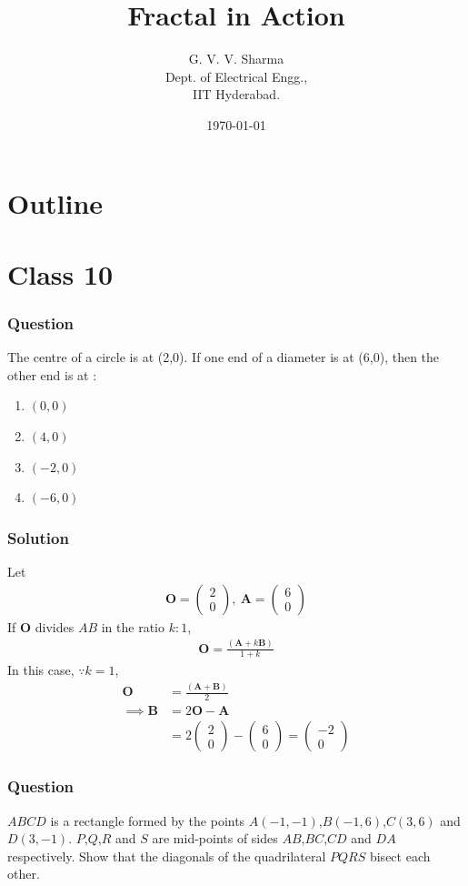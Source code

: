 \documentclass{beamer}
\title{Fractal in Action}
\author{G. V. V. Sharma \\ Dept. of Electrical Engg.,\\IIT Hyderabad.}
\date{\today}
\providecommand{\brak}[1]{\ensuremath{\left(#1\right)}}
\theoremstyle{remark}
\newcommand{\myvec}[1]{\ensuremath{\begin{pmatrix}#1\end{pmatrix}}}
\let\vec\mathbf
\begin{document}
\begin{frame}
\titlepage
\end{frame}

\section*{Outline}
\begin{frame}
\tableofcontents
\end{frame}
\section{Class 10}
\begin{frame}
\frametitle{Question}
The centre of a circle is at (2,0). If one end of a diameter is at (6,0), then the other end is at :
\begin{enumerate}
\item $\brak{0,0}$
\item $\brak{4,0}$
\item $\brak{-2,0}$
\item $\brak{-6,0}$
\end{enumerate}
\end{frame}
%
\begin{frame}
\frametitle{Solution}
Let
\begin{align}
	\vec{O} =
    \myvec{
2 \\
0 
},\
\vec{A} =
    \myvec{
6 \\
0 
}
\end{align}
If $\vec{O}$
divides $AB$ in the ratio $k:1$,
\begin{align}
	\label{eq:section}
\vec{O} = \frac{\brak{\vec{A} +k \vec{B}}}{1+k}
\end{align}
In this case,  $\because k = 1$,
\begin{align}
\vec{O} &= \frac{\brak{\vec{A} + \vec{B}}}{2}\\
\implies \vec{B} &= 2\vec{O} - \vec{A}\\
    &=  2\myvec{
2 \\
0 
} -  \myvec{
6 \\
0 
}
=\myvec{
   -2\\
   0
}
\end{align}
\end{frame}
\begin{frame}
\frametitle{Question }
$ABCD$ is a rectangle formed by the points $A\brak{-1,-1}$,$B\brak{-1,6}$,$C\brak{3,6}$ and $D\brak{3,-1}$. $P$,$Q$,$R$ and $S$ are mid-points of sides $AB$,$BC$,$CD$ and $DA$ respectively. Show that the diagonals of the quadrilateral $PQRS$ bisect each other. 
\end{frame}
\end{document}
